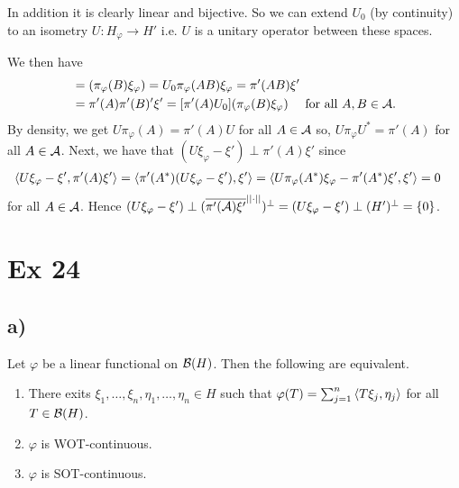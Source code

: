 \documentclass[10pt,english,a4paper]{article}
\theoremstyle{definition}
\def\pivp{\pi_{\vphi}}
\def\Hvp{H_{\vphi}}
\def\xivp{\xi_{\vphi}}
\def\vphi{\varphi}
\begin{document}
In addition it is clearly linear and bijective. So we can extend $U_0$
(by continuity) to an isometry $U \colon \Hvp \to H'$ i.e. $U$ is a unitary operator 
between these spaces. 

We then have 
\begin{align*}
[U\pivp(A)] &= (\pivp(B)\xivp) = U_0\pivp(AB)\xivp = \pi'(AB)\xi' \\ &=
\pi'(A)\pi'(B)'\xi' = [\pi'(A)U_0](\pivp(B)\xivp) \quad \text{ for all }A,B\in
\As.
\end{align*}
By density, we get $U\pivp(A) = \pi'(A)U$ for all $A \in \mathcal{A}$ so, $U\pivp U^* =
\pi'(A)$ for all $A\in \mathcal{A}$.
Next, we have that $(U\xivp -\xi')\perp \pi'(A)\xi'$
since 
\begin{align*}
\ind{U\xivp-\xi', \pi'(A)\xi'} &= \ind{\pi'(A^*)(U\xivp - \xi'), \xi'} = 
\ind{U\pivp(A^*)\xivp - \pi'(A^*)\xi', \xi'} = 0
\end{align*}
for all $A \in \mathcal{A}$. Hence $(U\xivp - \xi') \perp(\ol{\pi'(\As)\xi'}^{||\cdot||})^{\perp} = 
(U\xivp - \xi') \perp (H')^{\perp} = \{0\}$. 

\section*{Ex 24}
\subsection*{a)}
Let $\vphi$ be a linear functional on $\mathcal{B}(H)$. Then the following are
equivalent. 
\begin{enumerate}[(1)]
    \item There exits $\xi_1,\ldots,\xi_n,\eta_1,\ldots,\eta_n \in H$
such that $\vphi(T) = \sum_{j=1}^{n} \ind{T\xi_j,\eta_j}$ for all $T \in \mathcal{B}(H)$.
\item $\vphi$ is WOT-continuous. 
\item $\vphi$ is SOT-continuous.
\end{enumerate}
\end{document}
